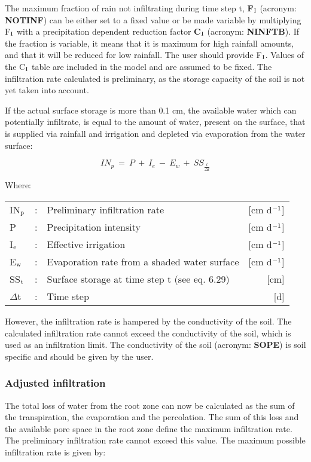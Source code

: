 The maximum fraction of rain not infiltrating during time step t, {\bf F$_{{\rm I}}$} 
(acronym: {\bf NOTINF})
can be either set to a fixed value or be made variable by multiplying F$_{{\rm I}}$ 
with a precipita\-tion dependent reduction factor {\bf C$_{{\rm I}}$} (acronym: {\bf NINFTB}). 
If the fraction is variable, it means that it is maximum for high rainfall amounts, and 
that it will be reduced for low rainfall. The user should provide F$_{{\rm I}}$. 
Values of the C$_{{\rm I}}$ table are included in the model and
are assumed to be fixed. The infiltration rate calculated is preliminary, as the storage
capacity of the soil is not yet taken into account. 

If the actual surface storage is more than 0.1 cm, the available water which can 
potential\-ly infiltrate, is equal to the amount of water, present on the surface, that is supplied via
rainfall and irrigation and depleted via evaporation from the water surface:

\begin{equation}
IN_{p} ~=~P~+~I _{e} ~-~ E _{w~} +~ SS _{\frac{t}{\Delta t}} 
\end{equation}

Where:\\
\begin{tabularx}{\textwidth}{llXr}
IN$_{{\rm p}}$ &:& Preliminary infiltration rate  & [cm d$^{{\rm -1}}$]\\
P &:& Precipitation intensity  & [cm d$^{{\rm -1}}$]\\
I$_{{\rm e}}$ &:& Effective irrigation  & [cm d$^{{\rm -1}}$]\\
E$_{{\rm w}}$ &:& Evaporation rate from a shaded water surface  & [cm d$^{{\rm -1}}$]\\
SS$_{{\rm t}}$ &:& Surface storage at time step t (see eq. 6.29)  & [cm]\\
$\Delta$t &:& Time step  & [d]\\
\end{tabularx}
 
However, the infiltration rate is hampered by the conductivity of the soil. The calculated
infiltration rate cannot exceed the conductivity of the soil, which is used as an infiltration
limit. The conductivity of the soil (acronym: {\bf SOPE}) is soil specific and should be given
by the user.

\subsubsection{Adjusted infiltration}
The total loss of water from the root zone can now be calculated as the sum of the
transpiration, the evaporation and the perco\-lation. The sum of this loss and the available
pore space in the root zone define the maximum infiltra\-tion rate. The preliminary
infiltration rate cannot exceed this value. The maximum possible infiltration rate is given
by:

